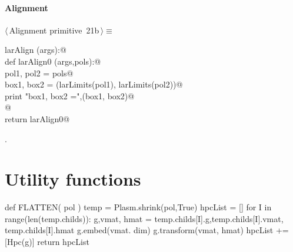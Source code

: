 \documentclass[11pt,oneside]{article}	%
\begin{document}
\paragraph{Alignment}
\begin{flushleft} \small \label{scrap40}
\protect{}$\langle\,$Alignment primitive\nobreak\ {\footnotesize 21b}$\,\rangle\equiv$
\vspace{-1ex}
\begin{list}{}{} \item
\mbox{}\verb@def larAlign (args):@\\
\mbox{}\verb@   def larAlign0 (args,pols):@\\
\mbox{}\verb@      pol1, pol2 = pols@\\
\mbox{}\verb@      box1, box2 = (larLimits(pol1), larLimits(pol2))@\\
\mbox{}\verb@      print "box1, box2 =",(box1, box2)@\\
\mbox{}\verb@      @\\
\mbox{}\verb@   return larAlign0@\\
\mbox{}\verb@@{\NWsep}
\end{list}
\vspace{-1ex}
\footnotesize\addtolength{\baselineskip}{-1ex}
\begin{list}{}{\setlength{\itemsep}{-\parsep}\setlength{\itemindent}{-\leftmargin}}
\item {\NWtxtMacroNoRef}.
\end{list}
\end{flushleft}

\appendix
\section{Utility functions}



def FLATTEN( pol )
	temp = Plasm.shrink(pol,True)
	hpcList = []
	for I in range(len(temp.childs)):			
		g,vmat, hmat = temp.childs[I].g,temp.childs[I].vmat, temp.childs[I].hmat
		g.embed(vmat. dim)
		g.transform(vmat, hmat)
		hpcList += [Hpc(g)]
	return hpcList
	
\end{document}
